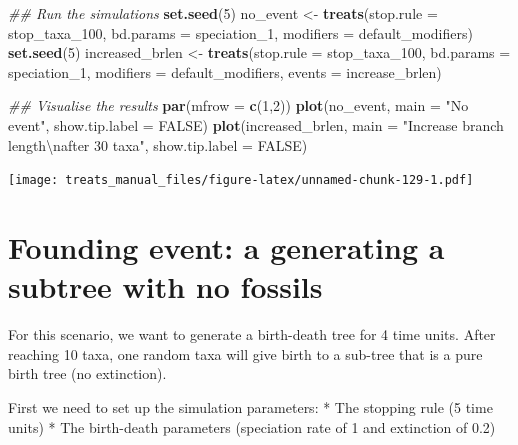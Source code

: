 \documentclass[
]{book}
\newenvironment{Shaded}{\begin{snugshade}}{\end{snugshade}}
\newcommand{\CharTok}[1]{\textcolor[rgb]{0.31,0.60,0.02}{#1}}
\newcommand{\CommentTok}[1]{\textcolor[rgb]{0.56,0.35,0.01}{\textit{#1}}}
\newcommand{\DataTypeTok}[1]{\textcolor[rgb]{0.13,0.29,0.53}{#1}}
\newcommand{\DecValTok}[1]{\textcolor[rgb]{0.00,0.00,0.81}{#1}}
\newcommand{\KeywordTok}[1]{\textcolor[rgb]{0.13,0.29,0.53}{\textbf{#1}}}
\newcommand{\NormalTok}[1]{#1}
\newcommand{\OtherTok}[1]{\textcolor[rgb]{0.56,0.35,0.01}{#1}}
\newcommand{\StringTok}[1]{\textcolor[rgb]{0.31,0.60,0.02}{#1}}
\begin{document}
\begin{Shaded}
\begin{Highlighting}[]
\CommentTok{\#\# Run the simulations}
\KeywordTok{set.seed}\NormalTok{(}\DecValTok{5}\NormalTok{)}
\NormalTok{no\_event \textless{}{-}}\StringTok{ }\KeywordTok{treats}\NormalTok{(}\DataTypeTok{stop.rule =}\NormalTok{ stop\_taxa\_}\DecValTok{100}\NormalTok{,}
                 \DataTypeTok{bd.params =}\NormalTok{ speciation\_}\DecValTok{1}\NormalTok{,}
                 \DataTypeTok{modifiers =}\NormalTok{ default\_modifiers)}
\KeywordTok{set.seed}\NormalTok{(}\DecValTok{5}\NormalTok{)}
\NormalTok{increased\_brlen \textless{}{-}}\StringTok{ }\KeywordTok{treats}\NormalTok{(}\DataTypeTok{stop.rule =}\NormalTok{ stop\_taxa\_}\DecValTok{100}\NormalTok{,}
                        \DataTypeTok{bd.params =}\NormalTok{ speciation\_}\DecValTok{1}\NormalTok{,}
                        \DataTypeTok{modifiers =}\NormalTok{ default\_modifiers,}
                        \DataTypeTok{events    =}\NormalTok{ increase\_brlen)}

\CommentTok{\#\# Visualise the results}
\KeywordTok{par}\NormalTok{(}\DataTypeTok{mfrow =} \KeywordTok{c}\NormalTok{(}\DecValTok{1}\NormalTok{,}\DecValTok{2}\NormalTok{))}
\KeywordTok{plot}\NormalTok{(no\_event, }\DataTypeTok{main =} \StringTok{"No event"}\NormalTok{, }\DataTypeTok{show.tip.label =} \OtherTok{FALSE}\NormalTok{)}
\KeywordTok{plot}\NormalTok{(increased\_brlen, }\DataTypeTok{main =} \StringTok{"Increase branch length}\CharTok{\textbackslash{}n}\StringTok{after 30 taxa"}\NormalTok{,}
    \DataTypeTok{show.tip.label =} \OtherTok{FALSE}\NormalTok{)}
\end{Highlighting}
\end{Shaded}

\texttt{[image: treats\_manual\_files/figure-latex/unnamed-chunk-129-1.pdf]}

\hypertarget{EG_founding_purebirth}{%
\section{Founding event: a generating a subtree with no fossils}\label{EG_founding_purebirth}}

For this scenario, we want to generate a birth-death tree for 4 time units.
After reaching 10 taxa, one random taxa will give birth to a sub-tree that is a pure birth tree (no extinction).

First we need to set up the simulation parameters:
* The stopping rule (5 time units)
* The birth-death parameters (speciation rate of 1 and extinction of 0.2)
\end{document}
